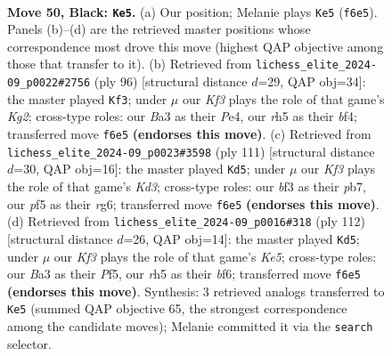 \documentclass[11pt]{article}
\begin{document}
\clearpage

\begin{figure}[p]\centering
\begin{subfigure}{0.46\textwidth}\centering
\resizebox{\linewidth}{!}{%
\newchessgame
\chessboard[
  setfen={8/p7/5k2/1p3P1R/8/bq3BK1/8/8 b - - 3 50},
  showmover=false,
  pgfstyle=straightmove, color=movearrow, markmove={f6-e5}
]}
\caption{}
\end{subfigure}\hfill
\begin{subfigure}{0.46\textwidth}\centering
\resizebox{\linewidth}{!}{%
\newchessgame
\chessboard[
  setfen={8/2r5/2P5/3Q2pk/4Pb2/8/6K1/8 w - - 19 49},
  showmover=false,
  pgfstyle=straightmove, color=movearrow, markmove={g2-f3}
]}
\caption{}
\end{subfigure}
\\[4pt]
\begin{subfigure}{0.46\textwidth}\centering
\resizebox{\linewidth}{!}{%
\newchessgame
\chessboard[
  setfen={1q6/1P6/1K1k2R1/4p3/6P1/8/8/8 b - - 3 56},
  showmover=false,
  pgfstyle=straightmove, color=movearrow, markmove={d6-d5}
]}
\caption{}
\end{subfigure}\hfill
\begin{subfigure}{0.46\textwidth}\centering
\resizebox{\linewidth}{!}{%
\newchessgame
\chessboard[
  setfen={8/3Q2pk/5b2/4KP1p/8/P7/8/8 w - - 1 57},
  showmover=false,
  pgfstyle=straightmove, color=movearrow, markmove={e5-d5}
]}
\caption{}
\end{subfigure}
\caption{\textbf{Move 50, Black: \texttt{Ke5}.} (a) Our position; Melanie plays \texttt{Ke5} (\texttt{f6e5}). Panels (b)--(d) are the retrieved master positions whose correspondence most drove this move (highest QAP objective among those that transfer to it). (b) Retrieved from \texttt{lichess\_elite\_2024-09\_p0022\#2756} (ply 96) [structural distance $d$=29, QAP obj=34]: the master played \texttt{Kf3}; under $\mu$ our \emph{Kf3} plays the role of that game's \emph{Kg2}; cross-type roles: our \emph{B}a3 as their \emph{P}e4, our \emph{r}h5 as their \emph{b}f4; transferred move \texttt{f6e5} \textbf{(endorses this move)}. (c) Retrieved from \texttt{lichess\_elite\_2024-09\_p0023\#3598} (ply 111) [structural distance $d$=30, QAP obj=16]: the master played \texttt{Kd5}; under $\mu$ our \emph{Kf3} plays the role of that game's \emph{Kd3}; cross-type roles: our \emph{b}f3 as their \emph{p}b7, our \emph{p}f5 as their \emph{r}g6; transferred move \texttt{f6e5} \textbf{(endorses this move)}. (d) Retrieved from \texttt{lichess\_elite\_2024-09\_p0016\#318} (ply 112) [structural distance $d$=26, QAP obj=14]: the master played \texttt{Kd5}; under $\mu$ our \emph{Kf3} plays the role of that game's \emph{Ke5}; cross-type roles: our \emph{B}a3 as their \emph{P}f5, our \emph{r}h5 as their \emph{b}f6; transferred move \texttt{f6e5} \textbf{(endorses this move)}. Synthesis: 3 retrieved analogs transferred to \texttt{Ke5} (summed QAP objective 65, the strongest correspondence among the candidate moves); Melanie committed it via the \texttt{search} selector.}
\label{fig:thought-m99}
\end{figure}
\end{document}

